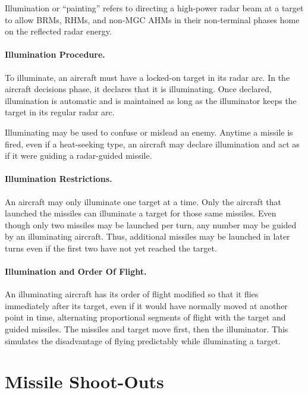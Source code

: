 {Illumination or “painting” refers to directing a high-power radar beam at a target to allow BRMs, RHMs, and non-MGC AHMs in their non-terminal phases home on the reflected radar energy.


\paragraph{Illumination Procedure.} To illuminate, an aircraft must have a locked-on target in its radar arc. In the aircraft decisions phase, it declares that it is illuminating. Once declared, illumination is automatic and is maintained as long as the illuminator keeps the target in its regular radar arc.

Illuminating may be used to confuse or mislead an enemy. Anytime a missile is fired, even if a heat-seeking type, an aircraft may declare illumination and act as if it were guiding a radar-guided missile.

\paragraph{Illumination Restrictions.} An aircraft may only illuminate one target at a time. Only the aircraft that launched the missiles can illuminate a target for those same missiles. Even though only two missiles may be launched per turn, any number may be guided by an illuminating aircraft. Thus, additional missiles may be launched in later turns even if the first two have not yet reached the target.

\paragraph{Illumination and Order Of Flight.} An illuminating aircraft has its order of flight modified so that it flies immediately after its target, even if it would have normally moved at another point in time, alternating proportional segments of flight with the target and guided missiles. The missiles and target move first, then the illuminator. This simulates the disadvantage of flying predictably while illuminating a target.

}

\section{Missile Shoot-Outs}
\label{rule:missile-shoot-outs}

